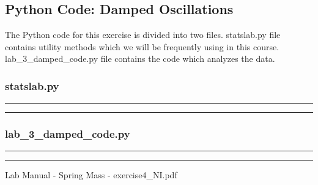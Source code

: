 \documentclass[letterpaper,12pt]{article}
\begin{document}
\pagebreak

\subsection{Python Code: Damped Oscillations}

The Python code for this exercise is divided into two files. statslab.py file contains utility methods
which we will be frequently using in this course. lab\_3\_damped\_code.py file contains the code which analyzes
the data.

\subsubsection{statslab.py}
\noindent\rule{\textwidth}{1pt}

\noindent\rule{\textwidth}{1pt}

\pagebreak

\subsubsection{lab\_3\_damped\_code.py}
\noindent\rule{\textwidth}{1pt}

\noindent\rule{\textwidth}{1pt}

\pagebreak

\begin{thebibliography}{99}

 Lab Manual - Spring Mass - exercise4\_NI.pdf

\end{thebibliography}
\end{document}
